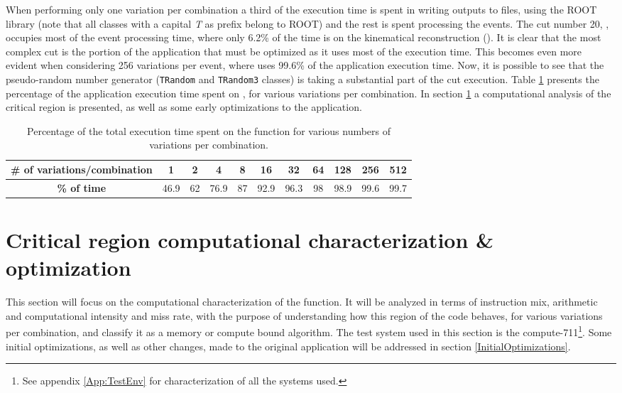 When performing only one variation per combination a third of the execution time is spent in writing outputs to files, using the ROOT library (note that all classes with a capital \textit{T} as prefix belong to ROOT) and the rest is spent processing the events. The cut number 20, \ttDilepKinFit, occupies most of the event processing time, where only 6.2\% of the time is on the kinematical reconstruction (\dilep). It is clear that the most complex cut is the portion of the application that must be optimized as it uses most of the execution time. This becomes even more evident when considering 256 variations per event, where \ttDilepKinFit uses 99.6\% of the application execution time. Now, it is possible to see that the pseudo-random number generator (\texttt{TRandom} and \texttt{TRandom3} classes) is taking a substantial part of the cut execution. Table \ref{tab:TempoKinFit} presents the percentage of the application execution time spent on \ttDilepKinFit, for various variations per combination. In section \ref{CriticalRegion} a computational analysis of the critical region is presented, as well as some early optimizations to the application.

\begin{table}[!htp]
	\begin{center}
		\begin{tabular}{|c|c|c|c|c|c|c|c|c|c|c|}
			\hline
			\textbf{# of variations/combination} & 1 & 2 & 4 & 8 & 16 & 32 & 64 & 128 & 256 & 512 \\ \hline
			\textbf{\% of time} & 46.9 & 62 & 76.9 & 87 & 92.9 & 96.3 & 98 & 98.9 & 99.6 & 99.7 \\ \hline
		\end{tabular}
		\caption{Percentage of the total execution time spent on the \ttDilepKinFit function for various numbers of variations per combination.}
		\label{tab:TempoKinFit}
	\end{center}
\end{table}

\section{Critical region computational characterization \& optimization}
\label{CriticalRegion}

This section will focus on the computational characterization of the \ttDilepKinFit function. It will be analyzed in terms of instruction mix, arithmetic and computational intensity and miss rate, with the purpose of understanding how this region of the code behaves, for various variations per combination, and classify it as a memory or compute bound algorithm. The test system used in this section is the compute-711\footnote{See appendix \ref{App:TestEnv} for characterization of all the systems used.}. Some initial optimizations, as well as other changes, made to the original application will be addressed in section \ref{InitialOptimizations}.


